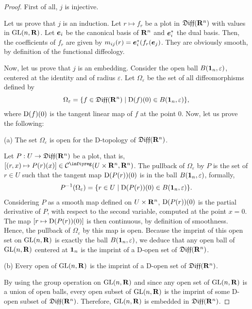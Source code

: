 \begin{proof}
  First of all,
  $j$ is injective.

  Let us prove that $j$ is an induction.
  Let $r \mapsto f_r$ be a plot in $\mathfrak{Diff}(\mathbf{R}^n)$ with values in $\mathrm{GL}(n,\mathbf{R})$.
  Let ${\boldsymbol e}_i$ be the canonical basis of $\mathbf{R}^n$ and ${\boldsymbol e}_i^*$ the dual basis.
  Then,
  the coefficients of $f_r$ are given by $m_{ij}(r) ={\boldsymbol e}_i^*(f_r({\boldsymbol e}_j)$.
  They are obviously smooth,
  by definition of the functional diffeology.

  Now,
  let us prove that $j$ is an embedding.
  Consider the open ball $B({\mathbf{1}}_n,\varepsilon)$,
  centered at the identity and of radius $\varepsilon$.
  Let $\Omega_{\varepsilon}$ be the set of all diffeomorphisms defined by
  \begin{displaymath}
    \Omega_{\varepsilon} = \{f \in \mathfrak{Diff}(\mathbf{R}^{n}) \mid \operatorname{D}(f)(0) \in B({\mathbf{1}}_n,\varepsilon) \},
  \end{displaymath}
  where $\operatorname{D}(f)(0)$ is the tangent linear map of $f$ at the point $0$.
  Now,
  let us prove the following:

  (a) The set $\Omega_{\varepsilon}$ is open
  for the D-topology of $\mathfrak{Diff}(\mathbf{R}^{n})$.

  Let $P : U \rightarrow \mathfrak{Diff}(\mathbf{R}^{n})$ be a plot,
  that is,
  $[(r,x)\mapsto P(r)(x)]\in \Cinfty(U \times \RR^{n},\RR^{n})$.
  The pullback of $\Omega_{\varepsilon}$ by $P$ is the set of $r \in U$ such that the tangent map $\operatorname{D}(P(r))(0)$ is in the ball $B({\mathbf{1}}_n, \varepsilon)$,
  formally,
  $$%
    P^{-1}(\Omega_{\varepsilon}) = \{ r\in U \mid \Der(P(r))(0) \in B(\Id_n, \varepsilon) \}.
  $$%
  Considering $P$ as a smooth map
  defined on
  $U \times \mathbf{R}^{n}$,
  $\operatorname{D}(P(r))(0)$ is the partial derivative of $P$,
  with respect to the second variable,
  computed at the point $x=0$.
  The map $[r \mapsto \operatorname{D}(P(r))(0)]$ is then continuous,
  by definition of smoothness.
  Hence,
  the pullback of $\Omega_{\varepsilon}$ by this map is open.
  Because the imprint of this open set on $\mathrm{GL}(n,\mathbf{R})$ is exactly the ball $B({\mathbf{1}}_n, \varepsilon)$,
  we deduce that any open ball of $\mathrm{GL}(n,\mathbf{R})$ centered at ${\mathbf{1}}_n$ is the imprint of a D-open set of $\mathfrak{Diff}(\mathbf{R}^{n})$.

  (b) Every open of $\mathrm{GL}(n,\mathbf{R})$ is the imprint of a D-open set of $\mathfrak{Diff}(\mathbf{R}^n)$.

  By using the group operation on $\mathrm{GL}(n,\mathbf{R})$ and since any open set of $\mathrm{GL}(n,\mathbf{R})$ is a union of open balls,
  every open subset of $\mathrm{GL}(n,\mathbf{R})$ is the imprint of some D-open subset of $\mathfrak{Diff}(\mathbf{R}^n)$.
  Therefore,
  $\mathrm{GL}(n,\mathbf{R})$ is embedded in $\mathfrak{Diff}(\mathbf{R}^{n})$.
\end{proof}

